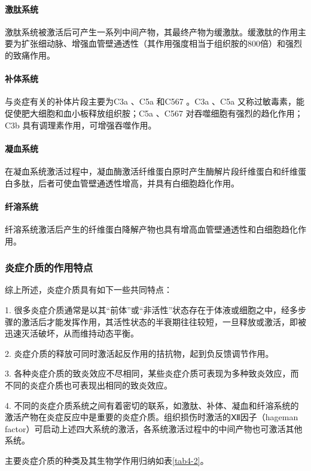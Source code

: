 \paragraph{激肽系统}
激肽系统被激活后可产生一系列中间产物，其最终产物为缓激肽。缓激肽的作用主要为扩张细动脉、增强血管壁通透性（其作用强度相当于组织胺的800倍）和强烈的致痛作用。

\paragraph{补体系统}
与炎症有关的补体片段主要为C{3a} 、C{5a} 和C{567}
。C{3a}
、C{5a} 又称过敏毒素，能促使肥大细胞和血小板释放组织胺；C{5a} 、C{567}
对吞噬细胞有强烈的趋化作用；C{3b} 具有调理素作用，可增强吞噬作用。

\paragraph{凝血系统}
在凝血系统激活过程中，凝血酶激活纤维蛋白原时产生酶解片段纤维蛋白和纤维蛋白多肽，后者可使血管壁通透性增高，并具有白细胞趋化作用。

\paragraph{纤溶系统}
纤溶系统激活后产生的纤维蛋白降解产物也具有增高血管壁通透性和白细胞趋化作用。

\subsubsection{炎症介质的作用特点}

综上所述，炎症介质具有如下一些共同特点：

1.
很多炎症介质通常是以其“前体”或“非活性”状态存在于体液或细胞之中，经多步骤的激活后才能发挥作用，其活性状态的半衰期往往较短，一旦释放或激活，即被迅速灭活破坏，从而维持动态平衡。

2. 炎症介质的释放可同时激活起反作用的拮抗物，起到负反馈调节作用。

3.
各种炎症介质的致炎效应不尽相同，某些炎症介质可表现为多种致炎效应，而不同的炎症介质也可表现出相同的致炎效应。

4.
不同的炎症介质系统之间有着密切的联系，如激肽、补体、凝血和纤溶系统的激活产物在炎症反应中是重要的炎症介质。组织损伤时激活的Ⅻ因子（hageman
factor）可启动上述四大系统的激活，各系统激活过程中的中间产物也可激活其他系统。

主要炎症介质的种类及其生物学作用归纳如表\ref{tab4-2}。

